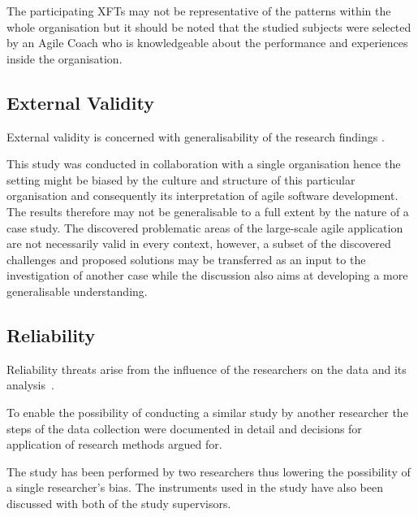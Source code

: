 The participating \acp{XFT} may not be representative of the patterns within the whole organisation but it should be noted that the studied subjects were selected by an Agile Coach who is knowledgeable about the performance and experiences inside the organisation.

\subsection{External Validity}

External validity is concerned with generalisability of the research findings \citep{runeson}.

This study was conducted in collaboration with a single organisation hence the setting might be biased by the culture and structure of this particular organisation and consequently its interpretation of agile software development. The results therefore may not be generalisable to a full extent by the nature of a case study. The discovered problematic areas of the large-scale agile application are not necessarily valid in every context, however, a subset of the discovered challenges and proposed solutions may be transferred as an input to the investigation of another case while the discussion also aims at developing a more generalisable understanding.

\subsection{Reliability}

Reliability threats arise from the influence of the researchers on the data and its analysis~\citep{runeson}.

To enable the possibility of conducting a similar study by another researcher the steps of the data collection were documented in detail and decisions for application of research methods argued for.

The study has been performed by two researchers thus lowering the possibility of a single researcher's bias. The instruments used in the study have also been discussed with both of the study supervisors.